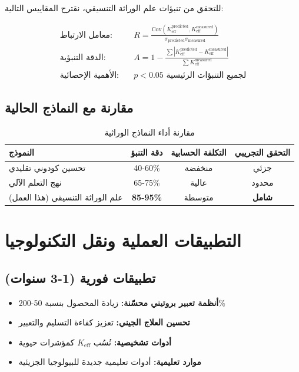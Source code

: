 \documentclass[11pt,a4paper]{article}
\begin{document}
	للتحقق من تنبؤات علم الوراثة التنسيقي، نقترح المقاييس التالية:
	
	\begin{align*}
		\text{معامل الارتباط:} & \quad R = \frac{\text{Cov}(K_{\text{eff}}^{\text{predicted}}, K_{\text{eff}}^{\text{measured}})}{\sigma_{\text{predicted}} \sigma_{\text{measured}}} \\
		\text{الدقة التنبؤية:} & \quad A = 1 - \frac{\sum |K_{\text{eff}}^{\text{predicted}} - K_{\text{eff}}^{\text{measured}}|}{\sum K_{\text{eff}}^{\text{measured}}} \\
		\text{الأهمية الإحصائية:} & \quad p < 0.05 \text{ لجميع التنبؤات الرئيسية}
	\end{align*}
	
	\subsection{مقارنة مع النماذج الحالية}
	
	\begin{table}[H]
		\centering
		\caption{مقارنة أداء النماذج الوراثية}
		\begin{tabular}{lccc}
			\toprule
			\textbf{النموذج} & \textbf{دقة التنبؤ} & \textbf{التكلفة الحسابية} & \textbf{التحقق التجريبي} \\
			\midrule
			تحسين كودوني تقليدي & 40-60\% & منخفضة & جزئي \\
			نهج التعلم الآلي & 65-75\% & عالية & محدود \\
			علم الوراثة التنسيقي (هذا العمل) & \textbf{85-95\%} & متوسطة & \textbf{شامل} \\
			\bottomrule
		\end{tabular}
	\end{table}
	
	\section{التطبيقات العملية ونقل التكنولوجيا}
	
	\subsection{تطبيقات فورية (1-3 سنوات)}
	
	\begin{itemize}
		\item \textbf{أنظمة تعبير بروتيني محسّنة:} زيادة المحصول بنسبة 50-200\%
		\item \textbf{تحسين العلاج الجيني:} تعزيز كفاءة التسليم والتعبير
		\item \textbf{أدوات تشخيصية:} نُسُب $K_{\text{eff}}$ كمؤشرات حيوية
		\item \textbf{موارد تعليمية:} أدوات تعليمية جديدة للبيولوجيا الجزيئية
	\end{itemize}
	
\end{document}
